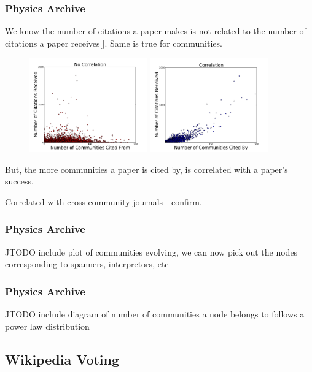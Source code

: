 \documentclass{beamer}
\begin{document}
\begin{frame}\frametitle{Physics Archive}
We know the number of citations a paper makes is not related to the number of citations a paper receives[].
 Same is true for communities.
\begin{figure}
\includegraphics[width=2in]{Figures/communities_cites}
\includegraphics[width=2in]{Figures/communities_cited_by}
\end{figure}
But, the more communities a paper is cited by, is correlated with a paper's success.

Correlated with cross community journals - confirm.
\end{frame}


\begin{frame}\frametitle{Physics Archive}
JTODO include plot of communities evolving, we can now pick out the nodes corresponding to spanners, interpretors, etc
\end{frame}

\begin{frame}\frametitle{Physics Archive}
JTODO include diagram of number of communities a node belongs to follows a power law distribution
\end{frame}

\subsection{Wikipedia Voting}
\end{document}
